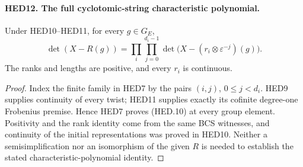 \documentclass[11pt,a4paper]{article}
\numberwithin{equation}{section}
\theoremstyle{remark}\newtheorem{remark}[theorem]{Remark}
\begin{document}
\paragraph{HED12. The full cyclotomic-string characteristic polynomial.}
\label{claim:HED12}
Under HED10--HED11, for every \(g\in G_E\),
\[
 \det(X-R(g))=
     \prod_i\prod_{j=0}^{d_i-1}
             \det\bigl(X-(r_i\otimes\varepsilon^{-j})(g)\bigr).
 \tag{HED.10}
\]
The ranks and lengths are positive, and every \(r_i\) is continuous.
\begin{proof}
Index the finite family in HED7 by the pairs \((i,j)\),
\(0\leq j<d_i\).  HED9 supplies continuity of every twist;
HED11 supplies exactly its cofinite degree-one Frobenius premise.
Hence HED7 proves (HED.10) at every group element.  Positivity and
the rank identity come from the same BCS witnesses, and continuity
of the initial representations was proved in HED10.  Neither a
semisimplification nor an isomorphism of the given \(R\) is needed
to establish the stated characteristic-polynomial identity.
\end{proof}

\end{document}
